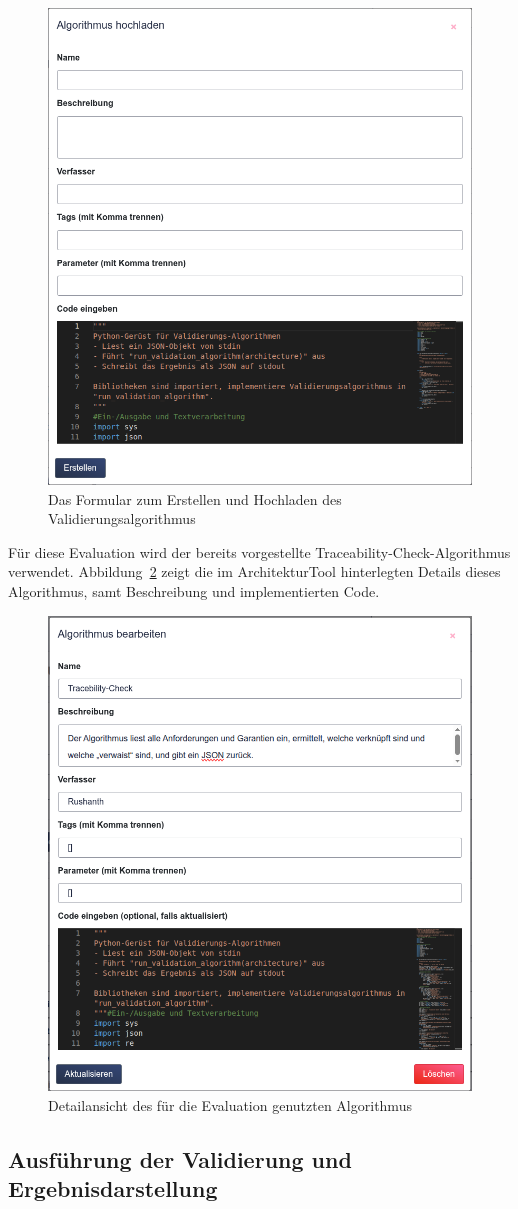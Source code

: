 \begin{figure}[h!]
  \centering
  \includegraphics[width=.5\textwidth]{figures/06Evaluation/Bildschirmfoto vom 2025-08-01 11-36-46.png}
  \caption{Das Formular zum Erstellen und Hochladen des Validierungsalgorithmus}
  \label{fig:formularclean}
\end{figure}

Für diese Evaluation wird der bereits vorgestellte Traceability-Check-Algorithmus verwendet. Abbildung~\ref{fig:formularfilled} zeigt die im ArchitekturTool hinterlegten Details dieses Algorithmus, samt Beschreibung und implementierten Code.

\begin{figure}[htp!]
  \centering
  \includegraphics[width=.5\textwidth]{figures/06Evaluation/Bildschirmfoto vom 2025-08-01 11-58-21.png}
  \caption{Detailansicht des für die Evaluation genutzten Algorithmus}
  \label{fig:formularfilled}
\end{figure}

\subsection{Ausführung der Validierung und Ergebnisdarstellung}

